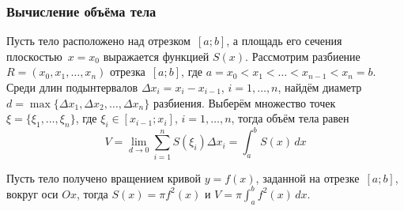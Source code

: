 \subsubsection{Вычисление объёма тела}
Пусть тело расположено над отрезком~$[a; b]$, а площадь его сечения плоскостью~$x = x_0$ выражается функцией $S(x)$.
Рассмотрим разбиение~$R = (x_0, x_1, \ldots, x_n)$ отрезка~$[a; b]$, где $a = x_0 < x_1 < \ldots < x_{n-1} < x_n = b$.
Среди длин подынтервалов $\Delta x_i = x_i - x_{i-1}$, $i = 1, \ldots, n$, найдём диаметр $d = \max \{ \Delta x_1, \Delta x_2, \ldots, \Delta x_n \}$ разбиения.
Выберём множество точек $\xi = \{ \xi_1, \ldots, \xi_n \}$, где $\xi_i \in [x_{i-1}; x_i]$, $i = 1, \ldots, n$, тогда объём тела равен
\begin{equation*}
V = \lim_{d \to 0} \sum_{i=1}^n S(\xi_i) \Delta x_i =
\int_a^b S(x)\,dx
\end{equation*}

Пусть тело получено вращением кривой $y = f(x)$, заданной на отрезке~$[a; b]$, вокруг оси $Ox$, тогда $S(x) = \pi f^2(x)$ и $\displaystyle V = \pi \int_a^b f^2(x)\,dx$.